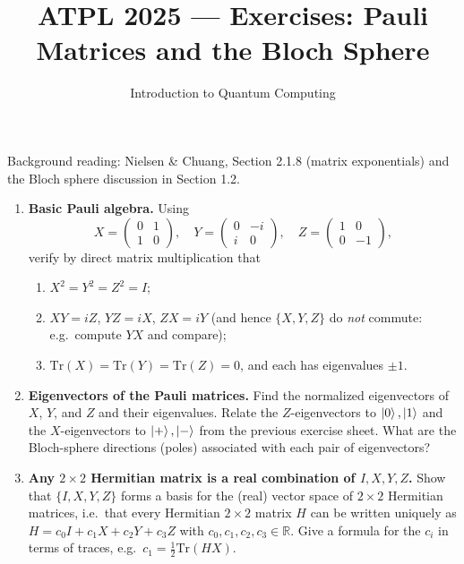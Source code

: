 \documentclass[11pt]{article}
\title{ATPL 2025 --- Exercises: Pauli Matrices and the Bloch Sphere}
\author{Introduction to Quantum Computing}
\date{}
\begin{document}
\maketitle

Background reading: Nielsen \& Chuang, Section 2.1.8 (matrix
exponentials) and the Bloch sphere discussion in Section 1.2.

\begin{enumerate}[label=\textbf{Exercise \arabic*.}, leftmargin=2.2cm]

\item \textbf{Basic Pauli algebra.}
Using
\[
X=\begin{pmatrix}0&1\\1&0\end{pmatrix},\quad
Y=\begin{pmatrix}0&-i\\i&0\end{pmatrix},\quad
Z=\begin{pmatrix}1&0\\0&-1\end{pmatrix},
\]
verify by direct matrix multiplication that
\begin{enumerate}[label=(\alph*)]
\item $X^2=Y^2=Z^2=I$;
\item $XY = iZ$, $YZ = iX$, $ZX = iY$ (and hence
$\{X,Y,Z\}$ do \emph{not} commute: e.g.\ compute $YX$ and compare);
\item $\mathrm{Tr}(X)=\mathrm{Tr}(Y)=\mathrm{Tr}(Z)=0$, and each has
eigenvalues $\pm1$.
\end{enumerate}

\item \textbf{Eigenvectors of the Pauli matrices.}
Find the normalized eigenvectors of $X$, $Y$, and $Z$ and their
eigenvalues. Relate the $Z$-eigenvectors to $\ket0,\ket1$ and the
$X$-eigenvectors to $\ket+,\ket-$ from the previous exercise sheet.
What are the Bloch-sphere directions (poles) associated with each pair of
eigenvectors?

\item \textbf{Any $2\times2$ Hermitian matrix is a real combination of
$I,X,Y,Z$.}
Show that $\{I,X,Y,Z\}$ forms a basis for the (real) vector space of
$2\times2$ Hermitian matrices, i.e.\ that every Hermitian $2\times2$
matrix $H$ can be written uniquely as
$H = c_0 I + c_1 X + c_2 Y + c_3 Z$ with $c_0,c_1,c_2,c_3\in\mathbb R$.
Give a formula for the $c_i$ in terms of traces, e.g.\ $c_1 =
\tfrac12\mathrm{Tr}(HX)$.


\end{enumerate}
\end{document}
